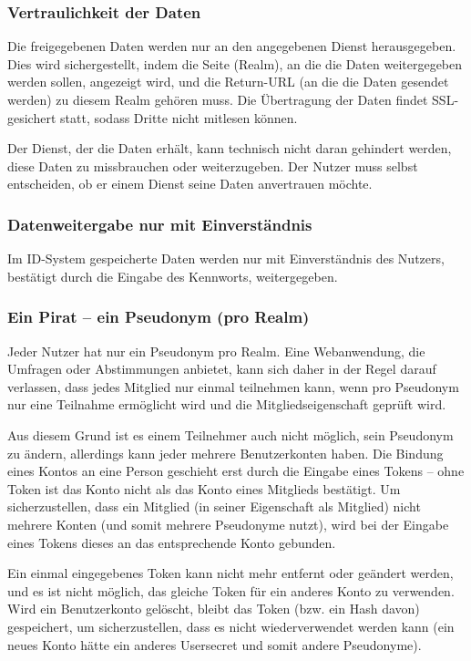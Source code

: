 \subsubsection{Vertraulichkeit der Daten}
Die freigegebenen Daten werden nur an den angegebenen Dienst herausgegeben.
Dies wird sichergestellt, indem die Seite (Realm), an die die Daten weitergegeben werden sollen, angezeigt wird,
und die Return-URL (an die die Daten gesendet werden) zu diesem Realm gehören muss.
Die Übertragung der Daten findet SSL-gesichert statt, sodass Dritte nicht mitlesen können.

Der Dienst, der die Daten erhält, kann technisch nicht daran gehindert werden, diese Daten zu missbrauchen oder weiterzugeben.
Der Nutzer muss selbst entscheiden, ob er einem Dienst seine Daten anvertrauen möchte.

\subsubsection{Datenweitergabe nur mit Einverständnis}
Im ID-System gespeicherte Daten werden nur mit Einverständnis des Nutzers, bestätigt durch die Eingabe des Kennworts, weitergegeben.

\subsubsection{Ein Pirat -- ein Pseudonym (pro Realm)}
Jeder Nutzer hat nur ein Pseudonym pro Realm.
Eine Webanwendung, die Umfragen oder Abstimmungen anbietet, kann sich daher in der Regel darauf verlassen, dass jedes Mitglied nur einmal teilnehmen kann,
wenn pro Pseudonym nur eine Teilnahme ermöglicht wird und die Mitgliedseigenschaft geprüft wird.

Aus diesem Grund ist es einem Teilnehmer auch nicht möglich, sein Pseudonym zu ändern, allerdings kann jeder mehrere Benutzerkonten haben.
Die Bindung eines Kontos an eine Person geschieht erst durch die Eingabe eines Tokens -- ohne Token ist das Konto nicht als das Konto eines Mitglieds bestätigt.
Um sicherzustellen, dass ein Mitglied (in seiner Eigenschaft als Mitglied) nicht mehrere Konten (und somit mehrere Pseudonyme nutzt),
wird bei der Eingabe eines Tokens dieses an das entsprechende Konto gebunden.

Ein einmal eingegebenes Token kann nicht mehr entfernt oder geändert werden, und es ist nicht möglich, das gleiche Token für ein anderes Konto zu verwenden.
Wird ein Benutzerkonto gelöscht, bleibt das Token (bzw. ein Hash davon) gespeichert, um sicherzustellen, dass es nicht wiederverwendet werden kann
(ein neues Konto hätte ein anderes Usersecret und somit andere Pseudonyme).

